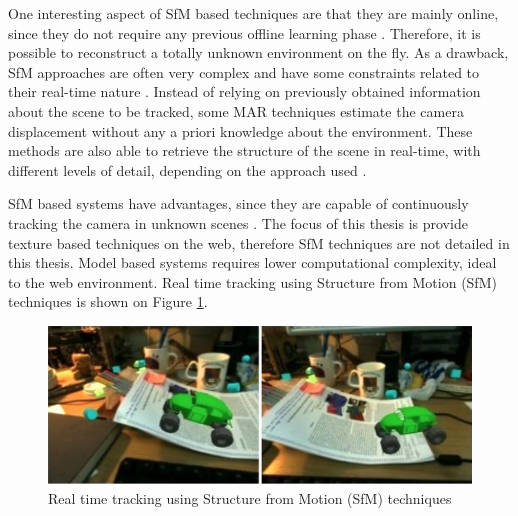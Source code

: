One interesting aspect of SfM based techniques are that they are mainly online, since they do not require any previous offline learning phase \cite{Teichrieb2007}. Therefore, it is possible to reconstruct a totally unknown environment on the fly. As a drawback, SfM approaches are often very complex and have some constraints related to their real-time nature \cite{Teichrieb2007}.
Instead of relying on previously obtained information about the scene to be tracked, some MAR techniques estimate the camera displacement without any a priori knowledge about the environment. These methods are also able to retrieve the structure of the scene in real-time, with different levels of detail, depending on the approach used \cite{Teichrieb2007}.

SfM based systems have advantages, since they are capable of continuously tracking the camera in unknown scenes \cite{Teichrieb2007}. The focus of this thesis is provide texture based techniques on the web, therefore SfM techniques are not detailed in this thesis. Model based systems requires lower computational complexity, ideal to the web environment. Real time tracking using Structure from Motion (SfM) techniques \cite{Teichrieb2007} is shown on Figure \ref{figure:sfm}.

\begin{figure}[!htb]
  \centering
  \includegraphics[width=350pt]{chapters/basic_concepts/sfm.png}
  \caption{Real time tracking using Structure from Motion (SfM) techniques}
  \label{figure:sfm}
\end{figure}



